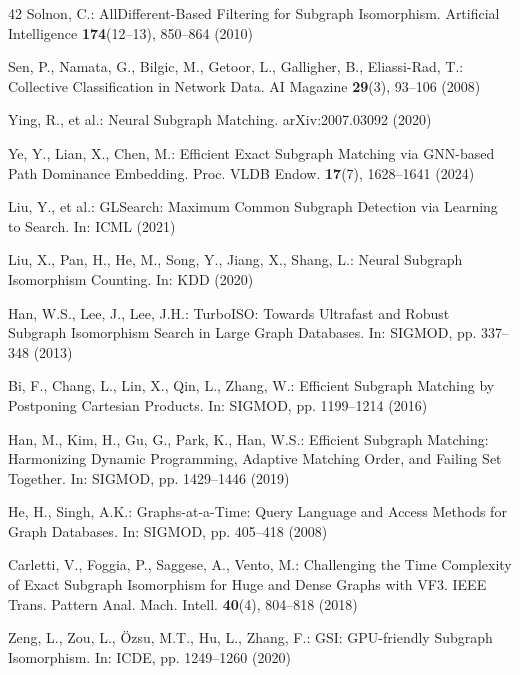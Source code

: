 \documentclass{article}
\begin{document}
{\begin{thebibliography}{42}
Solnon, C.: AllDifferent-Based Filtering for Subgraph Isomorphism. Artificial Intelligence \textbf{174}(12--13), 850--864 (2010)

Sen, P., Namata, G., Bilgic, M., Getoor, L., Galligher, B., Eliassi-Rad, T.: Collective Classification in Network Data. AI Magazine \textbf{29}(3), 93--106 (2008)

Ying, R., et al.: Neural Subgraph Matching. arXiv:2007.03092 (2020)

Ye, Y., Lian, X., Chen, M.: Efficient Exact Subgraph Matching via GNN-based Path Dominance Embedding. Proc. VLDB Endow. \textbf{17}(7), 1628--1641 (2024)

Liu, Y., et al.: GLSearch: Maximum Common Subgraph Detection via Learning to Search. In: ICML (2021)

Liu, X., Pan, H., He, M., Song, Y., Jiang, X., Shang, L.: Neural Subgraph Isomorphism Counting. In: KDD (2020)

Han, W.S., Lee, J., Lee, J.H.: TurboISO: Towards Ultrafast and Robust Subgraph Isomorphism Search in Large Graph Databases. In: SIGMOD, pp. 337--348 (2013)

Bi, F., Chang, L., Lin, X., Qin, L., Zhang, W.: Efficient Subgraph Matching by Postponing Cartesian Products. In: SIGMOD, pp. 1199--1214 (2016)

Han, M., Kim, H., Gu, G., Park, K., Han, W.S.: Efficient Subgraph Matching: Harmonizing Dynamic Programming, Adaptive Matching Order, and Failing Set Together. In: SIGMOD, pp. 1429--1446 (2019)

He, H., Singh, A.K.: Graphs-at-a-Time: Query Language and Access Methods for Graph Databases. In: SIGMOD, pp. 405--418 (2008)

Carletti, V., Foggia, P., Saggese, A., Vento, M.: Challenging the Time Complexity of Exact Subgraph Isomorphism for Huge and Dense Graphs with VF3. IEEE Trans. Pattern Anal. Mach. Intell. \textbf{40}(4), 804--818 (2018)

Zeng, L., Zou, L., \"{O}zsu, M.T., Hu, L., Zhang, F.: GSI: GPU-friendly Subgraph Isomorphism. In: ICDE, pp. 1249--1260 (2020)


\end{thebibliography}}
\end{document}
